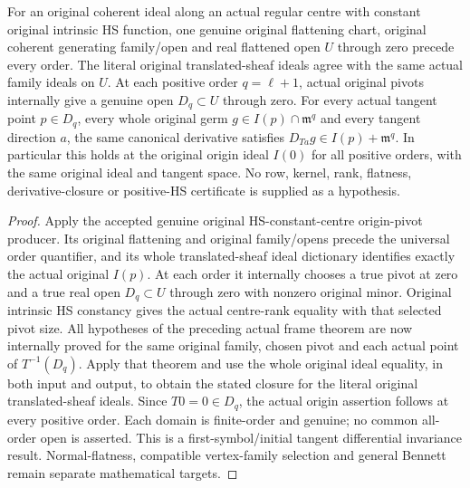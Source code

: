 \begin{theorem}
\label{hir:actual-original-hs-centre-first-symbol-tangent-closure}
\leanok
For an original coherent ideal along an actual regular centre with
constant original intrinsic HS function, one genuine original
flattening chart, original coherent generating family/open and real
flattened open $U$ through zero precede every order. The literal
original translated-sheaf ideals agree with the same actual family
ideals on $U$. At each positive order $q=\ell+1$, actual original
pivots internally give a genuine open $D_q\subset U$ through zero.
For every actual tangent point $p\in D_q$, every whole original
germ $g\in I(p)\cap\mathfrak m^q$ and every tangent direction $a$,
the same canonical derivative satisfies
$D_{Ta}g\in I(p)+\mathfrak m^q$.
In particular this holds at the original origin ideal $I(0)$ for
all positive orders, with the same original ideal and tangent space.
No row, kernel, rank, flatness, derivative-closure or positive-HS
certificate is supplied as a hypothesis.
\end{theorem}
\begin{proof}
Apply the accepted genuine original HS-constant-centre origin-pivot
producer. Its original flattening and original family/opens precede
the universal order quantifier, and its whole translated-sheaf ideal
dictionary identifies exactly the actual original $I(p)$.
At each order it internally chooses a true pivot at zero and a true
real open $D_q\subset U$ through zero with nonzero original minor.
Original intrinsic HS constancy gives the actual centre-rank equality
with that selected pivot size. All hypotheses of the preceding
actual frame theorem are now internally proved for the same original
family, chosen pivot and each actual point of $T^{-1}(D_q)$.
Apply that theorem and use the whole original ideal equality, in both
input and output, to obtain the stated closure for the literal
original translated-sheaf ideals. Since $T0=0\in D_q$, the actual
origin assertion follows at every positive order. Each domain is
finite-order and genuine; no common all-order open is asserted.
This is a first-symbol/initial tangent differential invariance result.
Normal-flatness, compatible vertex-family selection and general
Bennett remain separate mathematical targets.
\end{proof}
